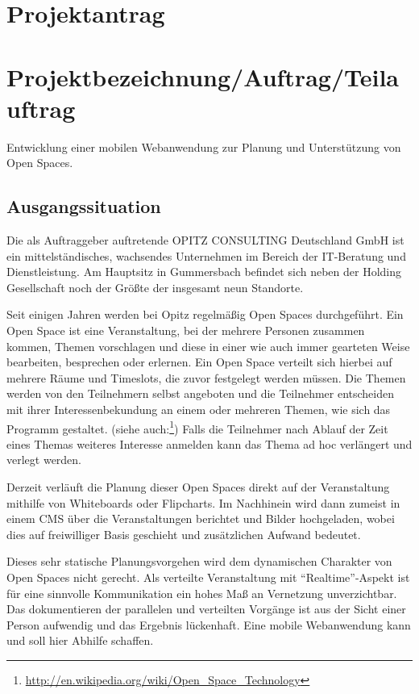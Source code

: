 \section{Projektantrag}
\section*{Projektbezeichnung/Auftrag/Teilauftrag}
Entwicklung einer mobilen Webanwendung zur Planung und Unterstützung
von Open Spaces.
\subsection*{Ausgangssituation}
Die als Auftraggeber auftretende OPITZ CONSULTING Deutschland GmbH ist
ein mittelständisches, wachsendes Unternehmen im Bereich der
IT-Beratung und Dienstleistung. Am Hauptsitz in Gummersbach befindet
sich neben der Holding Gesellschaft noch der Größte der insgesamt neun
Standorte.

\noindent Seit einigen Jahren werden bei Opitz regelmäßig Open Spaces durchgeführt.
Ein Open Space ist eine Veranstaltung, bei der mehrere Personen
zusammen kommen, Themen vorschlagen und diese in einer wie auch immer
gearteten Weise bearbeiten, besprechen oder erlernen. Ein Open Space
verteilt sich hierbei auf mehrere Räume und Timeslots, die zuvor
festgelegt werden müssen. Die Themen werden von den Teilnehmern selbst
angeboten und die Teilnehmer entscheiden mit ihrer Interessenbekundung
an einem oder mehreren Themen, wie sich das Programm gestaltet.
(siehe auch:\footnote{\url{http://en.wikipedia.org/wiki/Open_Space_Technology}})
Falls die Teilnehmer nach Ablauf der Zeit eines Themas weiteres
Interesse anmelden kann das Thema ad hoc verlängert und verlegt werden.

\noindent Derzeit verläuft die Planung dieser Open Spaces direkt auf
der Veranstaltung mithilfe von Whiteboards oder Flipcharts. Im
Nachhinein wird dann zumeist in einem CMS über die Veranstaltungen
berichtet und Bilder hochgeladen, wobei dies auf freiwilliger Basis
geschieht und zusätzlichen Aufwand bedeutet.

\noindent Dieses sehr statische Planungsvorgehen wird dem dynamischen
Charakter von Open Spaces nicht gerecht. Als verteilte Veranstaltung
mit ``Realtime''-Aspekt ist für eine sinnvolle Kommunikation ein hohes
Maß an Vernetzung unverzichtbar. Das dokumentieren der parallelen und
verteilten Vorgänge ist aus der Sicht einer Person aufwendig und das
Ergebnis lückenhaft. Eine mobile Webanwendung kann und soll hier
Abhilfe schaffen.

